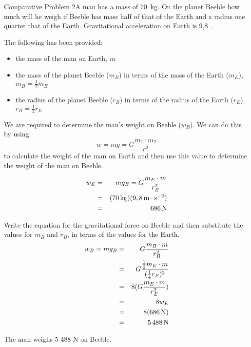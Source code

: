 \begin{wex}{Comparative Problem 2}{A man has a mass of 70~kg. On the planet Beeble how much will he weigh if Beeble has mass half of that of the Earth and a radius one quarter that of the Earth. Gravitational acceleration on Earth is 9,8~\mss.}
{
The following has been provided:
\begin{itemize}
\item the mass of the man on Earth, $m$
\item the mass of the planet Beeble ($m_B$) in terms of the mass of the Earth ($m_E$), $m_B=\frac{1}{2}m_E$
\item the radius of the planet Beeble ($r_B$) in terms of the radius of the Earth ($r_E$), $r_B=\frac{1}{4}r_E$
\end{itemize}

We are required to determine the man's weight on Beeble ($w_B$). We can do this by using:
\begin{equation}
w = mg = G\frac{m_1\cdot m_2}{r^2}
\end{equation}
to calculate the weight of the man on Earth and then use this value to determine the weight of the man on Beeble.

\begin{eqnarray*}
w_E &=& mg_E = G\frac{m_E \cdot m}{r_E^2}\\
&=&(70\,\mathrm{kg})(9,8\,\mathrm{m \cdot s^{-2}})\\
&=& 686\,\rm{N}
\end{eqnarray*}

Write the equation for the gravitational force on Beeble and then substitute the values for $m_B$ and $r_B$, in terms of the values for the Earth.
\begin{eqnarray*}
w_B = mg_B &=& G\frac{m_B\cdot m}{r_B^2}\\
&=&G\frac{\frac{1}{2}m_E\cdot m}{(\frac{1}{4}r_E)^2}\\
&=&8 (G\frac{m_E\cdot m}{r_E^2})\\
&=&8 w_E\\
&=&8(686\,\rm{N})\\
&=&5\,488\,\rm{N}
\end{eqnarray*}

The man weighs 5 488 N on Beeble.}
\end{wex}


